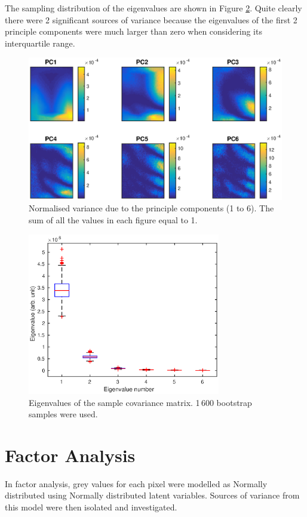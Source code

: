 \documentclass[12pt]{report}
\begin{document}
The sampling distribution of the eigenvalues are shown in Figure \ref{fig:initial_PC_eigenvalues}. Quite clearly there were 2 significant sources of variance because the eigenvalues of the first 2 principle components were much larger than zero when considering its interquartile range.

\begin{figure}[p]
	\includegraphics[width=\textwidth]{figures/initial_PCvariance.eps}
	\caption{Normalised variance due to the principle components (1 to 6). The sum of all the values in each figure equal to 1.}
	\label{fig:initial_PCvariance}
\end{figure}

\begin{figure}[p]
	\centering
	\includegraphics[width=0.75\textwidth]{figures/initial_PC_eigenvalues.eps}
	\caption{Eigenvalues of the sample covariance matrix. 1\,600 bootstrap samples were used.}
	\label{fig:initial_PC_eigenvalues}
\end{figure}

\section{Factor Analysis}
In factor analysis, grey values for each pixel were modelled as Normally distributed using Normally distributed latent variables. Sources of variance from this model  were then isolated and investigated.
\end{document}
